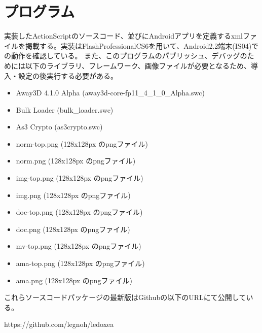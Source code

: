 \chapter{プログラム}
実装したActionScriptのソースコード、並びにAndroidアプリを定義するxmlファイルを掲載する。実装はFlashProfessionalCS6を用いて、Android2.2端末(IS04)での動作を確認している。
また、このプログラムのパブリッシュ、デバッグのためには以下のライブラリ、フレームワーク、画像ファイルが必要となるため、導入・設定の後実行する必要がある。
\begin{itemize}
\item Away3D 4.1.0 Alpha (away3d-core-fp11\_4\_1\_0\_Alpha.swc)\cite{away3d}
\item Bulk Loader (bulk\_loader.swc)\cite{bulkloader}
\item As3 Crypto (as3crypto.swc)\cite{as3crypto}
\item norm-top.png (128x128px のpngファイル)
\item norm.png (128x128px のpngファイル)
\item img-top.png (128x128px のpngファイル)
\item img.png (128x128px のpngファイル)
\item doc-top.png (128x128px のpngファイル)
\item doc.png (128x128px のpngファイル)
\item mv-top.png (128x128px のpngファイル)
\item ama-top.png (128x128px のpngファイル)
\item ama.png (128x128px のpngファイル)
\end{itemize}

これらソースコードパッケージの最新版はGithubの以下のURLにて公開している。 

https://github.com/legnoh/ledoxea


